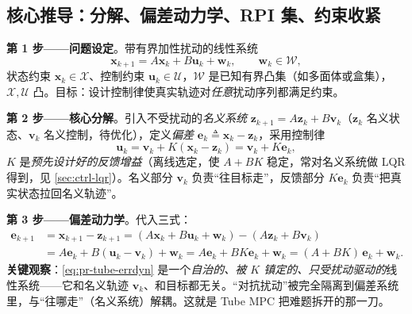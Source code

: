 \subsection{核心推导：分解、偏差动力学、RPI 集、约束收紧}
\label{sec:pr-tube-derivation}

\textbf{第 1 步——问题设定}。带有界加性扰动的线性系统
\begin{equation}
  \mathbf{x}_{k+1}=A\mathbf{x}_k+B\mathbf{u}_k+\mathbf{w}_k,\qquad \mathbf{w}_k\in\mathcal{W},
  \label{eq:pr-tube-sys}
\end{equation}
状态约束 $\mathbf{x}_k\in\mathcal{X}$、控制约束 $\mathbf{u}_k\in\mathcal{U}$，$\mathcal{W}$ 是已知有界凸集（如多面体或盒集），$\mathcal{X},\mathcal{U}$ 凸。目标：设计控制律使真实轨迹对\emph{任意}扰动序列都满足约束。

\textbf{第 2 步——核心分解}。引入不受扰动的\emph{名义系统} $\mathbf{z}_{k+1}=A\mathbf{z}_k+B\mathbf{v}_k$（$\mathbf{z}_k$ 名义状态、$\mathbf{v}_k$ 名义控制，待优化），定义\emph{偏差} $\mathbf{e}_k\triangleq\mathbf{x}_k-\mathbf{z}_k$，采用控制律
\begin{equation}
  \mathbf{u}_k=\mathbf{v}_k+K(\mathbf{x}_k-\mathbf{z}_k)=\mathbf{v}_k+K\mathbf{e}_k,
  \label{eq:pr-tube-law}
\end{equation}
$K$ 是\emph{预先设计好的反馈增益}（离线选定，使 $A+BK$ 稳定，常对名义系统做 LQR 得到，见 \cref{sec:ctrl-lqr}）。名义部分 $\mathbf{v}_k$ 负责“往目标走”，反馈部分 $K\mathbf{e}_k$ 负责“把真实状态拉回名义轨迹”。

\textbf{第 3 步——偏差动力学}。代入三式：
\begin{equation}
\begin{aligned}
\mathbf{e}_{k+1}&=\mathbf{x}_{k+1}-\mathbf{z}_{k+1}
=(A\mathbf{x}_k+B\mathbf{u}_k+\mathbf{w}_k)-(A\mathbf{z}_k+B\mathbf{v}_k)\\
&=A\mathbf{e}_k+B(\mathbf{u}_k-\mathbf{v}_k)+\mathbf{w}_k
=A\mathbf{e}_k+BK\mathbf{e}_k+\mathbf{w}_k
=(A+BK)\,\mathbf{e}_k+\mathbf{w}_k.
\end{aligned}
\label{eq:pr-tube-errdyn}
\end{equation}
\textbf{关键观察}：\cref{eq:pr-tube-errdyn} 是一个\emph{自治的、被 $K$ 镇定的、只受扰动驱动的}线性系统——它和名义轨迹 $\mathbf{v}_k$、和目标都无关。“对抗扰动”被完全隔离到偏差系统里，与“往哪走”（名义系统）解耦。这就是 Tube MPC 把难题拆开的那一刀。

